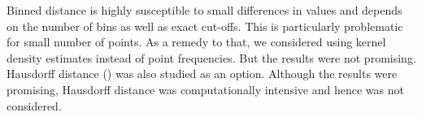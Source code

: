 \documentclass[12]{article}
\newcommand{\red}[1]{{\color{red} #1}}
\newcommand{\green}[1]{{\color{cyan} #1}}
\begin{document}
\begin{itemize}


%
%
%
%
%
\end{itemize}

Binned distance is highly susceptible to small differences in values and depends on the number of bins as well as exact cut-offs. This is particularly problematic for small number of points. As a remedy to that, we considered using kernel density estimates instead of point frequencies. But the results were not promising. Hausdorff distance (\cite{huttenlocher:1993}) was also studied as an option. Although the results were promising, Hausdorff distance was computationally intensive and hence was not considered. 
\end{document}
